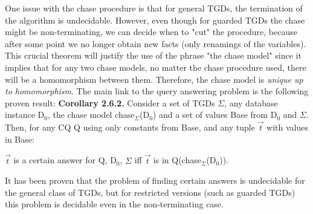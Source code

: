 \documentclass[11pt, a4paper, dvipsnames]{article}
\begin{document}
One issue with the chase procedure is that for general TGDs, the termination of the algorithm is undecidable. However, even though for guarded TGDs the chase might be non-terminating, we can decide when to "cut" the procedure, because after some point we no longer obtain new facts (only renamings of the variables).\newline
This crucial theorem will justify the use of the phrase "the chase model" since it implies that for any two chase models, no matter the chase procedure used, there will be a homomorphism between them. Therefore, the chase model is \textit{unique up to homomorphism}. 
The main link to the query answering problem is the following proven result:\newline
\textbf{Corollary 2.6.2.} Consider a set of TGDs $\Sigma$, any database instance D$_{0}$, the chase model chase$_{\Sigma}$(D$_{0}$) and a set of values Base from D$_{0}$ and $\Sigma$. Then, for any CQ Q using only constants from Base, and any tuple $\vec{t}$ with values in Base:
\begin{center}
$\vec{t}$ is a certain answer for Q, D$_{0}$, $\Sigma$ iff $\vec{t}$ is in Q(chase$_{\Sigma}$(D$_{0}$)). 
\end{center}
It has been proven that the problem of finding certain answers is undecidable for the general class of TGDs, but for restricted versions (such as guarded TGDs) this problem is decidable even in the non-terminating case.
\end{document}
